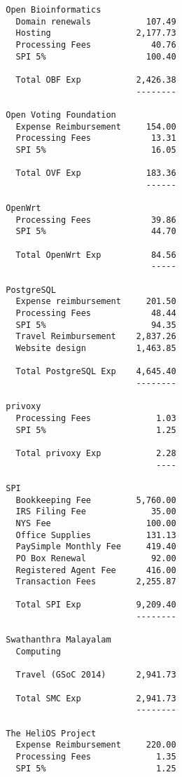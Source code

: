 \documentclass[letterpaper]{report}
\begin{document}
\begin{verbatim}
        Open Bioinformatics
          Domain renewals           107.49
          Hosting                 2,177.73
          Processing Fees            40.76
          SPI 5%                    100.40

          Total OBF Exp           2,426.38
                                  --------

        Open Voting Foundation
          Expense Reimbursement     154.00
          Processing Fees            13.31
          SPI 5%                     16.05

          Total OVF Exp             183.36
                                    ------

        OpenWrt
          Processing Fees            39.86
          SPI 5%                     44.70

          Total OpenWrt Exp          84.56
                                     -----

        PostgreSQL
          Expense reimbursement     201.50
          Processing Fees            48.44
          SPI 5%                     94.35
          Travel Reimbursement    2,837.26
          Website design          1,463.85

          Total PostgreSQL Exp    4,645.40
                                  --------

        privoxy
          Processing Fees             1.03
          SPI 5%                      1.25

          Total privoxy Exp           2.28
                                      ----

        SPI
          Bookkeeping Fee         5,760.00
          IRS Filing Fee             35.00
          NYS Fee                   100.00
          Office Supplies           131.13
          PaySimple Monthly Fee     419.40
          PO Box Renewal             92.00
          Registered Agent Fee      416.00
          Transaction Fees        2,255.87

          Total SPI Exp           9,209.40
                                  --------

        Swathanthra Malayalam
          Computing

          Travel (GSoC 2014)      2,941.73

          Total SMC Exp           2,941.73
                                  --------

        The HeliOS Project
          Expense Reimbursement     220.00
          Processing Fees             1.35
          SPI 5%                      1.25


\end{verbatim}
\end{document}
